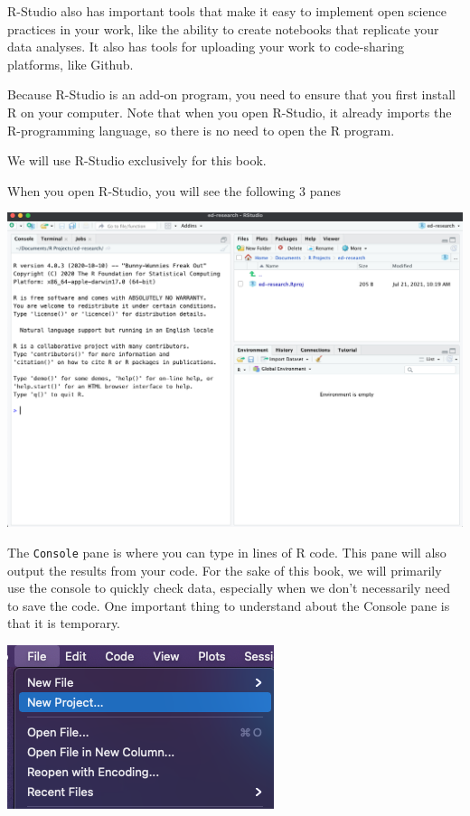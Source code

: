 \documentclass[
]{book}
\begin{document}
R-Studio also has important tools that make it easy to implement open science practices in your work, like the ability to create notebooks that replicate your data analyses. It also has tools for uploading your work to code-sharing platforms, like Github.

Because R-Studio is an add-on program, you need to ensure that you first install R on your computer. Note that when you open R-Studio, it already imports the R-programming language, so there is no need to open the R program.

We will use R-Studio exclusively for this book.

When you open R-Studio, you will see the following 3 panes

\includegraphics[width=1\linewidth]{images-figures/02-default-pane}

The \texttt{Console} pane is where you can type in lines of R code. This pane will also output the results from your code. For the sake of this book, we will primarily use the console to quickly check data, especially when we don't necessarily need to save the code. One important thing to understand about the Console pane is that it is temporary.

\includegraphics[width=1\linewidth]{images-figures/02-new-project}
\end{document}
